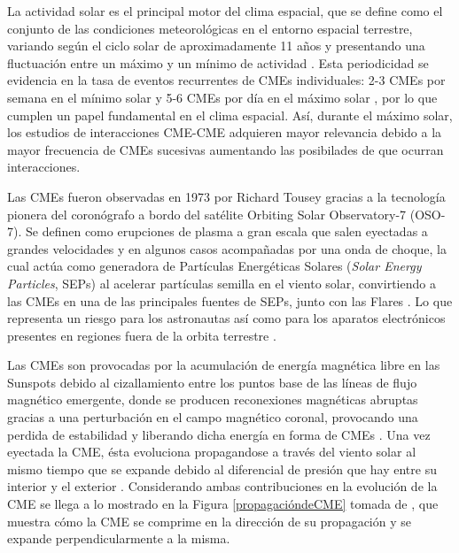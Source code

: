 La actividad solar es el principal motor del clima espacial, que se define como el conjunto de las condiciones meteorológicas en el entorno espacial terrestre, variando según el ciclo solar de aproximadamente 11 años y presentando una fluctuación entre un máximo y un mínimo de actividad \parencite[e.g.,][]{gnevyshev-1977, hathaway-2015}. Esta periodicidad se evidencia en la tasa de eventos recurrentes de CMEs individuales: 2-3 CMEs por semana en el mínimo solar y 5-6 CMEs por día en el máximo solar \parencite[e.g.,][]{lugaz-2017}, por lo que cumplen un papel fundamental en el clima espacial. Así, durante el máximo solar, los estudios de interacciones CME-CME adquieren mayor relevancia debido a la mayor frecuencia de CMEs sucesivas aumentando las posibilades de que ocurran interacciones.

Las CMEs fueron observadas en 1973 por Richard Tousey \parencite[e.g.][]{tousey1973solar} gracias a la tecnología pionera del coronógrafo a bordo del satélite Orbiting Solar Observatory-7 (OSO-7). Se definen como erupciones de plasma a gran escala que salen eyectadas a grandes velocidades y en algunos casos acompañadas por una onda de choque, la cual actúa como generadora de Partículas Energéticas Solares (\textit{Solar Energy Particles}, SEPs) al acelerar partículas semilla en el viento solar, convirtiendo a las CMEs en una de las principales fuentes de SEPs, \parencite[e.g.,][]{gopalswamy-2002, 2004ApJ...616L.171S} junto con las Flares \parencite[e.g.,][]{2016JSWSC...6A..42P}. Lo que representa un riesgo para los astronautas así como para los aparatos electrónicos presentes en regiones fuera de la orbita terrestre \parencite[e.g.,][]{2014swcm.book.....H, nhess-2018-92}. 

Las CMEs son provocadas por la acumulación de energía magnética libre en las Sunspots debido al cizallamiento entre los puntos base de las líneas de flujo magnético emergente, donde se producen reconexiones magnéticas abruptas gracias a una perturbación en el campo magnético coronal, provocando una perdida de estabilidad y liberando dicha energía en forma de CMEs \parencite[e.g.,][]{forbes-2000, mittal-2010}. Una vez eyectada la CME, ésta evoluciona propagandose a través del viento solar al mismo tiempo que se expande debido al diferencial de presión que hay entre su interior y el exterior \parencite[e.g.,][]{riley-2004}. Considerando ambas contribuciones en la evolución de la CME se llega a lo mostrado en la Figura \ref{propagacióndeCME} tomada de \textcite[e.g.,][]{odstrcil-2002}, que muestra cómo la CME se comprime en la dirección de su propagación y se expande perpendicularmente a la misma.

